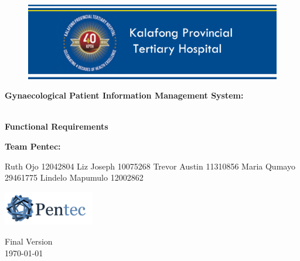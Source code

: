 \begin{titlepage}
	\begin{center}
		
		\begin{figure}[t]
			\centering
			\includegraphics[width=450px]{./Graphics/KPTH_Logo}
		\end{figure}		
		
		\textbf{\LARGE Gynaecological Patient Information
		Management System:}
		
		\vspace{1 cm}
	    \textbf{\LARGE \\Functional Requirements}
		
		\vspace{1 cm}
		\LARGE{\textbf{Team Pentec: }}
		

		\begin{flushright} \large
			
			Ruth Ojo 12042804\newline
			Liz Joseph 10075268\newline
			Trevor Austin 11310856\newline
			Maria Qumayo 29461775\newline
			Lindelo Mapumulo 12002862\newline
		\end{flushright}
		
				\vspace{1 cm}
				\centering
				\includegraphics[width=150px]{./Graphics/Pentec_Logo.png}

		
		
		{\LARGE Final Version}
		\\
		{\large \today}		
		
		
	\end{center}
\end{titlepage}
